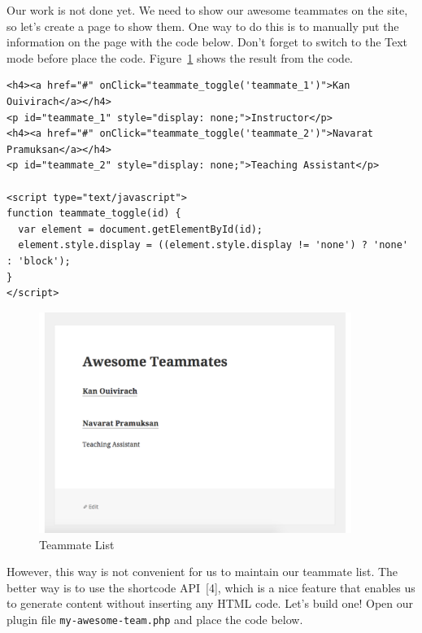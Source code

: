 \documentclass{article}
\begin{document}
\noindent Our work is not done yet. We need to show our awesome teammates on
the site, so let's create a page to show them. One way to do this is to
manually put the information on the page with the code below. Don't forget to
switch to the Text mode before place the code. Figure~\ref{fig:teammate-list}
shows the result from the code.

\begin{verbatim}
<h4><a href="#" onClick="teammate_toggle('teammate_1')">Kan Ouivirach</a></h4>
<p id="teammate_1" style="display: none;">Instructor</p>
<h4><a href="#" onClick="teammate_toggle('teammate_2')">Navarat Pramuksan</a></h4>
<p id="teammate_2" style="display: none;">Teaching Assistant</p>

<script type="text/javascript">
function teammate_toggle(id) {
  var element = document.getElementById(id);
  element.style.display = ((element.style.display != 'none') ? 'none' : 'block');
}
</script>
\end{verbatim}

\begin{figure}[t]
    \centering
    \includegraphics[width=4in]{figures/teammate-list}
    \caption{Teammate List}
    \label{fig:teammate-list}
\end{figure}

\noindent However, this way is not convenient for us to maintain our teammate
list. The better way is to use the shortcode API~[4], which is a nice feature
that enables us to generate content without inserting any HTML code. Let's
build one! Open our plugin file {\tt my-awesome-team.php} and place the code
below.
\end{document}
